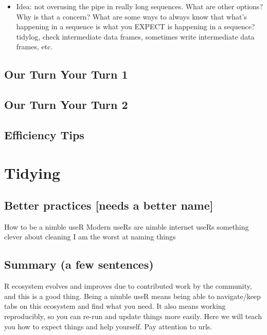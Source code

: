 \documentclass[]{book}
\providecommand{\tightlist}{%
  \setlength{\itemsep}{0pt}\setlength{\parskip}{0pt}}
\begin{document}
\begin{itemize}
\tightlist
\item
  Idea: not overusing the pipe in really long sequences. What are other options? Why is that a concern? What are some ways to always know that what's happening in a sequence is what you EXPECT is happening in a sequence? tidylog, check intermediate data frames, sometimes write intermediate data frames, etc.
\end{itemize}

\hypertarget{our-turn-your-turn-1-2}{%
\section{Our Turn Your Turn 1}\label{our-turn-your-turn-1-2}}

\hypertarget{our-turn-your-turn-2-2}{%
\section{Our Turn Your Turn 2}\label{our-turn-your-turn-2-2}}

\hypertarget{efficiency-tips-4}{%
\section{Efficiency Tips}\label{efficiency-tips-4}}

\hypertarget{tidying}{%
\chapter{Tidying}\label{tidying}}

\hypertarget{better-practices-needs-a-better-name}{%
\section{Better practices {[}needs a better name{]}}\label{better-practices-needs-a-better-name}}

How to be a nimble useR
Modern useRs are nimble internet useRs
something clever about cleaning
I am the worst at naming things

\hypertarget{summary-a-few-sentences-3}{%
\section{Summary (a few sentences)}\label{summary-a-few-sentences-3}}

R ecosystem evolves and improves due to contributed work by the community, and this is a good thing. Being a nimble useR means being able to navigate/keep tabs on this ecosystem and find what you need. It also means working reproducibly, so you can re-run and update things more easily. Here we will teach you how to expect things and help yourself. Pay attention to urls.
\end{document}
